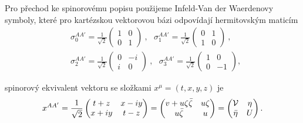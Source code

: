 Pro přechod ke spinorovému popisu použijeme Infeld-Van der Waerdenovy symboly, které pro kartézskou
vektorovou bázi odpovídají hermitovským maticím
\begin{equation}
    \label{eq:infeld-van-der-waerden}
    \begin{split}
        &\sigma_0^{AA'}=\frac{1}{\sqrt{2}}\left(\begin{matrix}
            1 & 0 \\
            0 & 1
        \end{matrix}\right)~,~~~ \sigma_1^{AA'}=\frac{1}{\sqrt{2}}\left(\begin{matrix}
            0 & 1 \\
            1 & 0
        \end{matrix}\right)~,\\
        &\sigma_2^{AA'}=\frac{1}{\sqrt{2}}\left(\begin{matrix}
            0 & -i \\
            i & 0
        \end{matrix}\right)~,~~~ \sigma_3^{AA'}=\frac{1}{\sqrt{2}}\left(\begin{matrix}
            1 & 0 \\
            0 & -1
        \end{matrix}\right),
    \end{split}
\end{equation}

spinorový ekvivalent vektoru se složkami $x^\mu = (t, x, y, z)$ je
\begin{equation}
    \label{eq:spinor_vektor}
    x^{AA'} = \frac{1}{\sqrt{2}} \begin{pmatrix}
        t + z & x - iy \\
        x + iy & t - z
    \end{pmatrix} = \begin{pmatrix}
        v + u \zeta \bar{\zeta} & u \zeta \\
        u \bar{\zeta} & u
    \end{pmatrix} = \begin{pmatrix}
        \mathcal{V} & \eta \\
        \bar{\eta} & U
    \end{pmatrix}.
\end{equation}

